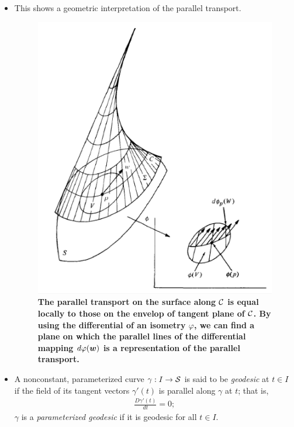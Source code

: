 \documentclass[11pt]{article}
\begin{document}
\begin{itemize}
\item \begin{remark}
This shows a geometric interpretation of the parallel transport.
\begin{figure}[htb]
\centering
\begin{minipage}{0.6\linewidth}
 \centerline{\includegraphics[scale = 0.43]{para_transp3.png}}
\end{minipage}
\caption{\scriptsize
\textbf{The parallel transport on the surface along ${\mathcal C}$ is equal locally to those on the envelop of tangent plane of ${\mathcal C}$.  By using the differential of an isometry $\varphi$, we can find a plane on which the parallel lines of the differential mapping $d\varphi(\boldsymbol{w})$ is a representation of the parallel transport.   }}
\end{figure}
\end{remark}\vspace{15pt}


 

\item \begin{definition}
 A nonconstant, parameterized curve $\gamma: I \rightarrow {\mathcal S}$ is said to be \emph{geodesic} at $t\in I$ if the field of its tangent vectors $\gamma'(t)$ is parallel along $\gamma$ at $t$; that is, 
\begin{align*}
\frac{D\gamma'(t)}{dt} = 0;
\end{align*}
$\gamma$ is a \emph{parameterized geodesic} if it is geodesic for all $t\in I$.


\end{definition}
\end{itemize}
\end{document}
